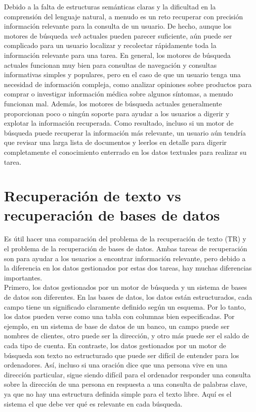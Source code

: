 Debido a la falta de estructuras semánticas claras y la dificultad en la comprensión del lenguaje natural, a menudo es un reto recuperar con precisión información relevante para la consulta de un usuario. De hecho, aunque los motores de búsqueda \textit{web} actuales pueden parecer suficiente, aún puede ser complicado para un usuario localizar y recolectar rápidamente toda la información relevante para una tarea. En general, los motores de búsqueda actuales funcionan muy bien para consultas de navegación y consultas informativas simples y populares, pero en el caso de que un usuario tenga una necesidad de información compleja, como analizar opiniones sobre productos para comprar o investigar información médica sobre algunos síntomas, a menudo funcionan mal. Además, los motores de búsqueda actuales generalmente proporcionan poco o ningún soporte para ayudar a los usuarios a digerir y explotar la información recuperada. Como resultado, incluso si un motor de búsqueda puede recuperar la información más relevante, un usuario aún tendría que revisar una larga lista de documentos y leerlos en detalle para digerir completamente el conocimiento enterrado en los datos textuales para realizar su tarea.

\section{Recuperación de texto vs recuperación de bases de datos}

Es útil hacer una comparación del problema de la recuperación de texto (TR) y el problema de la recuperación de bases de datos. Ambas tareas de recuperación son para ayudar a los usuarios a encontrar información relevante, pero debido a la diferencia en los datos gestionados por estas dos tareas, hay muchas diferencias importantes. \\

Primero, los datos gestionados por un motor de búsqueda y un sistema de bases de datos son diferentes. En las bases de datos, los datos están estructurados, cada campo tiene un significado claramente definido según un esquema. Por lo tanto, los datos pueden verse como una tabla con columnas bien especificadas. Por ejemplo, en un sistema de base de datos de un banco, un campo puede ser nombres de clientes, otro puede ser la dirección, y otro más puede ser el saldo de cada tipo de cuenta. En contraste, los datos gestionados por un motor de búsqueda son texto no estructurado que puede ser difícil de entender para los ordenadores. Así, incluso si una oración dice que una persona vive en una dirección particular, sigue siendo difícil para el ordenador responder una consulta sobre la dirección de una persona en respuesta a una consulta de palabras clave, ya que no hay una estructura definida simple para el texto libre. Aquí es el sistema el que debe ver qué es relevante en cada búsqueda. \\

